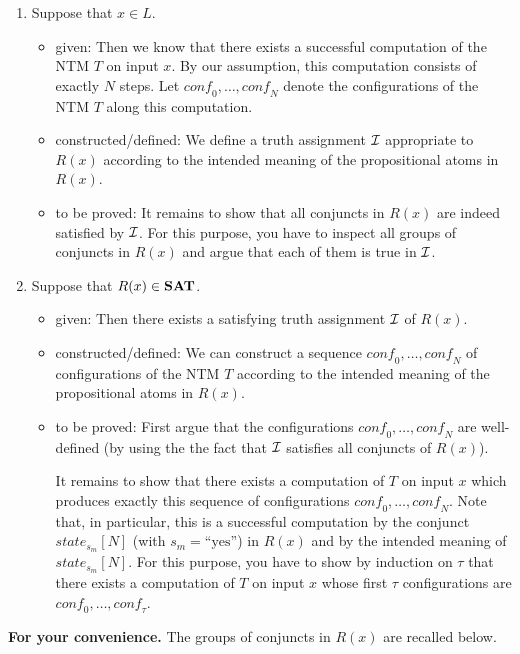 \documentclass [11pt]{article}
\newcommand{\yess}{\mbox{``yes''}}
\newcommand{\SAT}{\mbox{\bf SAT}}
\newcommand{\state}[2]{\textit{state}_{#1}[#2]}
\newcommand{\conf}{\textit{conf}}
\begin{document}
\begin{enumerate}
\item Suppose that $x \in L$. 
\begin{itemize}
\item given: Then we know that there exists a successful computation of the NTM $T$ on input $x$. By our assumption, this computation consists of exactly $N$ steps. Let $\conf_0, \dots, \conf_N$ denote the configurations of the NTM $T$ along this computation.
\item constructed/defined:  We define a truth assignment ${\cal I}$ appropriate to $R(x)$ according to the intended meaning of the propositional atoms in $R(x)$. 
\item to be proved: It remains to show that all conjuncts in $R(x)$ are indeed satisfied by ${\cal I}$. For this purpose, you have to inspect all groups of conjuncts in $R(x)$ and argue that each of them is true in ${\cal I}$.
\end{itemize}

\item Suppose that $R(x) \in \SAT$.
\begin{itemize}
\item given: Then there exists a satisfying truth assignment ${\cal I}$ of $R(x)$. 
\item constructed/defined: We can construct a sequence $\conf_0, \dots, \conf_N$ of configurations 
of the NTM $T$ according to the intended meaning of the propositional atoms in $R(x)$. 
\item to be proved: First argue that the configurations $\conf_0, \dots, \conf_N$ are well-defined (by using the the fact that ${\cal I}$ satisfies all conjuncts of $R(x)$).

It remains to show that there exists a computation of $T$ on input $x$ which produces exactly this sequence of configurations $\conf_0, \dots, \conf_N$. Note that, in particular, this is a successful computation by the conjunct $\state{s_m}{N}$
(with $s_m  = \yess$) in $R(x)$ and by the intended meaning of $\state{s_m}{N}$.
For this purpose, you have to  show by induction on $\tau$ that there exists 
a computation of $T$ on input $x$ whose first $\tau$ 
configurations are $\conf_0, \dots, \conf_\tau$.

\end{itemize}


\end{enumerate}



\noindent
{\bf For your convenience.} The groups of conjuncts in $R(x)$ are recalled below.
\end{document}
